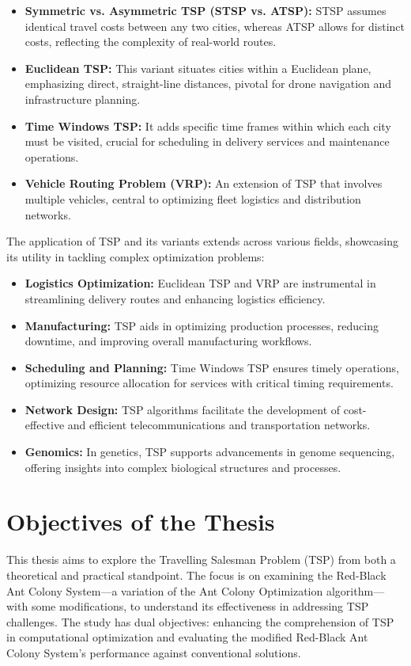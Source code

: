 \begin{itemize}
	\item \textbf{Symmetric vs. Asymmetric TSP (STSP vs. ATSP):} STSP assumes identical travel costs between any two cities, whereas ATSP allows for distinct costs, reflecting the complexity of real-world routes.
	\item \textbf{Euclidean TSP:} This variant situates cities within a Euclidean plane, emphasizing direct, straight-line distances, pivotal for drone navigation and infrastructure planning.
	\item \textbf{Time Windows TSP:} It adds specific time frames within which each city must be visited, crucial for scheduling in delivery services and maintenance operations.
	\item \textbf{Vehicle Routing Problem (VRP):} An extension of TSP that involves multiple vehicles, central to optimizing fleet logistics and distribution networks.
\end{itemize}

The application of TSP and its variants extends across various fields, showcasing its utility in tackling complex optimization problems:

\begin{itemize}
	\item \textbf{Logistics Optimization:} Euclidean TSP and VRP are instrumental in streamlining delivery routes and enhancing logistics efficiency.
	\item \textbf{Manufacturing:} TSP aids in optimizing production processes, reducing downtime, and improving overall manufacturing workflows.
	\item \textbf{Scheduling and Planning:} Time Windows TSP ensures timely operations, optimizing resource allocation for services with critical timing requirements.
	\item \textbf{Network Design:} TSP algorithms facilitate the development of cost-effective and efficient telecommunications and transportation networks.
	\item \textbf{Genomics:} In genetics, TSP supports advancements in genome sequencing, offering insights into complex biological structures and processes.
\end{itemize}
\section{Objectives of the Thesis}

This thesis aims to explore the Travelling Salesman Problem (TSP) from both a theoretical and practical standpoint. The focus is on examining the Red-Black Ant Colony System—a variation of the Ant Colony Optimization algorithm—with some modifications, to understand its effectiveness in addressing TSP challenges. The study has dual objectives: enhancing the comprehension of TSP in computational optimization and evaluating the modified Red-Black Ant Colony System's performance against conventional solutions.

